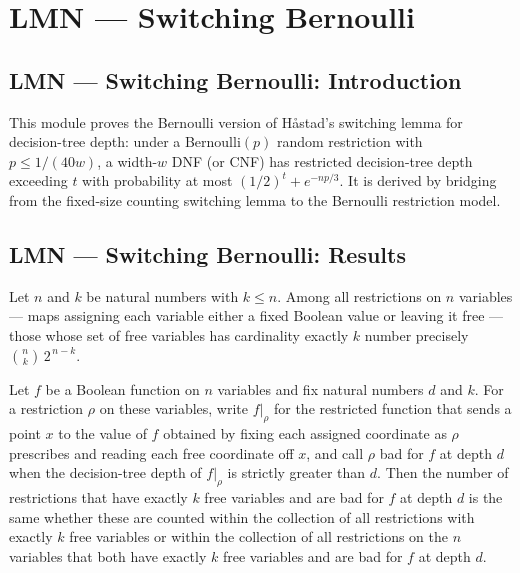 \section{LMN --- Switching Bernoulli}
\subsection*{LMN --- Switching Bernoulli: Introduction}

This module proves the Bernoulli version of Håstad's switching lemma for
decision-tree depth: under a Bernoulli$(p)$ random restriction with $p \le 1/(40w)$,
a width-$w$ DNF (or CNF) has restricted decision-tree depth exceeding $t$ with
probability at most $(1/2)^t + e^{-np/3}$. It is derived by bridging from the
fixed-size counting switching lemma to the Bernoulli restriction model.

\subsection*{LMN --- Switching Bernoulli: Results}

\begin{lemma}
\label{SwitchingBernoulli.fixedSizeRestrs_card}
\leanok
{}
Let $n$ and $k$ be natural numbers with $k \le n$. Among all restrictions on $n$
variables — maps assigning each variable either a fixed Boolean value or leaving it free
— those whose set of free variables has cardinality exactly $k$ number precisely
$\binom{n}{k}\,2^{\,n-k}$.
\end{lemma}

\begin{lemma}
\label{SwitchingBernoulli.fixedSizeRestrs_filter_bad_eq}
\leanok
{}
Let $f$ be a Boolean function on $n$ variables and fix natural numbers $d$ and $k$. For
a restriction $\rho$ on these variables, write $f|_\rho$ for the restricted function
that sends a point $x$ to the value of $f$ obtained by fixing each assigned coordinate
as $\rho$ prescribes and reading each free coordinate off $x$, and call $\rho$ bad for
$f$ at depth $d$ when the decision-tree depth of $f|_\rho$ is strictly greater than $d$.
Then the number of restrictions that have exactly $k$ free variables and are bad for $f$
at depth $d$ is the same whether these are counted within the collection of all
restrictions with exactly $k$ free variables or within the collection of all
restrictions on the $n$ variables that both have exactly $k$ free variables and are bad
for $f$ at depth $d$.
\end{lemma}

